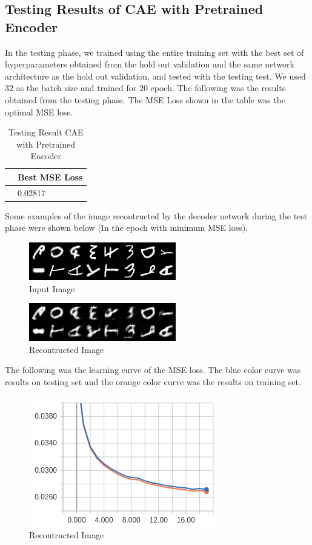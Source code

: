 \documentclass{article}
\begin{document}
\subsection{Testing Results of CAE with Pretrained Encoder}

In the testing phase, we trained using the entire training set with the best set of hyperparameters obtained from the hold out validation and the same network architecture as the hold out validation, and tested with the testing test. We used $32$ as the batch size and trained for $20$ epoch. The following was the results obtained from the testing phase. The MSE Loss shown in the table was the optimal MSE loss.

\begin{table}[htb]
\caption{Testing Result CAE with Pretrained Encoder}
	\label{sample-table}
	\centering
\begin{tabular}{ll}
\toprule
		\cmidrule{1-2}
		& Best MSE Loss	\\
	\midrule
 	& 0.02817 \\
\bottomrule
\end{tabular}
\end{table}


\pagebreak

Some examples of the image recontructed by the decoder network during the test phase were shown below (In the epoch with minimum MSE loss).


\begin{figure}[h]
  \centering
  \includegraphics[scale=0.9]{test_raw_image.png}
  \caption{Input Image}
\end{figure}

\begin{figure}[h]
  \centering
  \includegraphics[scale=0.9]{test_recond_image.png}
  \caption{Recontructed Image}
\end{figure}

The following was the learning curve of the MSE loss. The blue color curve was results on testing set and the orange color curve was the results on training set. 

\begin{figure}[h]
  \centering
  \includegraphics[scale=0.9]{mse_loss_test.png}
  \caption{Recontructed Image}
\end{figure}
\end{document}
